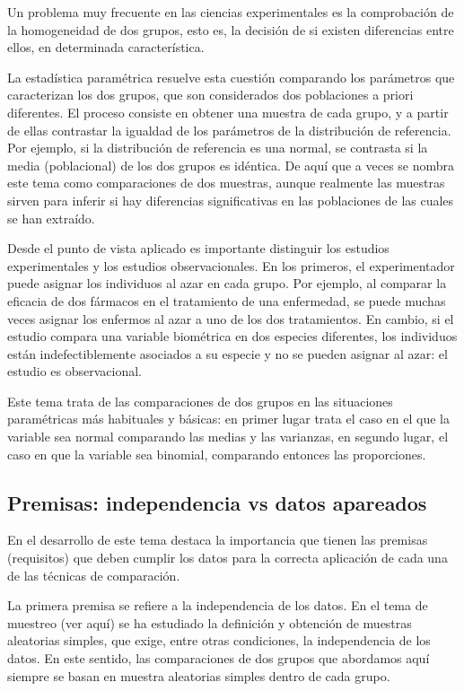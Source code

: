 \documentclass[
]{article}
\begin{document}
Un problema muy frecuente en las ciencias experimentales es la comprobación de la homogeneidad de dos grupos, esto es, la decisión de si existen diferencias entre ellos, en determinada característica.

La estadística paramétrica resuelve esta cuestión comparando los parámetros que caracterizan los dos grupos, que son considerados dos poblaciones a priori diferentes. El proceso consiste en obtener una muestra de cada grupo, y a partir de ellas contrastar la igualdad de los parámetros de la distribución de referencia. Por ejemplo, si la distribución de referencia es una normal, se contrasta si la media (poblacional) de los dos grupos es idéntica. De aquí que a veces se nombra este tema como comparaciones de dos muestras, aunque realmente las muestras sirven para inferir si hay diferencias significativas en las poblaciones de las cuales se han extraído.

Desde el punto de vista aplicado es importante distinguir los estudios experimentales y los estudios observacionales. En los primeros, el experimentador puede asignar los individuos al azar en cada grupo. Por ejemplo, al comparar la eficacia de dos fármacos en el tratamiento de una enfermedad, se puede muchas veces asignar los enfermos al azar a uno de los dos tratamientos. En cambio, si el estudio compara una variable biométrica en dos especies diferentes, los individuos están indefectiblemente asociados a su especie y no se pueden asignar al azar: el estudio es observacional.

Este tema trata de las comparaciones de dos grupos en las situaciones paramétricas más habituales y básicas: en primer lugar trata el caso en el que la variable sea normal comparando las medias y las varianzas, en segundo lugar, el caso en que la variable sea binomial, comparando entonces las proporciones.

\subsection{Premisas: independencia vs datos apareados}\label{premisas-independencia-vs-datos-apareados}

En el desarrollo de este tema destaca la importancia que tienen las premisas (requisitos) que deben cumplir los datos para la correcta aplicación de cada una de las técnicas de comparación.

La primera premisa se refiere a la independencia de los datos. En el tema de muestreo (ver aquí) se ha estudiado la definición y obtención de muestras aleatorias simples, que exige, entre otras condiciones, la independencia de los datos. En este sentido, las comparaciones de dos grupos que abordamos aquí siempre se basan en muestra aleatorias simples dentro de cada grupo.
\end{document}
